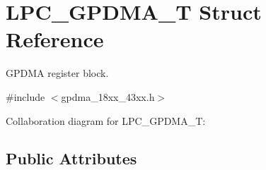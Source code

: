 \hypertarget{struct_l_p_c___g_p_d_m_a___t}{}\section{L\+P\+C\+\_\+\+G\+P\+D\+M\+A\+\_\+T Struct Reference}
\label{struct_l_p_c___g_p_d_m_a___t}


G\+P\+D\+MA register block.  




{\ttfamily \#include $<$gpdma\+\_\+18xx\+\_\+43xx.\+h$>$}



Collaboration diagram for L\+P\+C\+\_\+\+G\+P\+D\+M\+A\+\_\+T\+:
\subsection*{Public Attributes}
